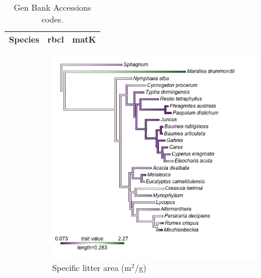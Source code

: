 \documentclass{article}
\begin{document}
\begin{table}[ht] \centering 
	\caption{Gen Bank Accessions codes.} 
	\label{Tab:genbank} 
	\begin{tabular}{l l l} 
	\toprule
		Species & rbcl & matK \\ 
		\midrule 
		
		\bottomrule
	\end{tabular} 
\end{table} 

\begin{figure}
   \centering
	\begin{subfigure}[h]{0.7\textwidth}
		\includegraphics[width=\textwidth]{figs/phylo_SLA.png}
		\caption{Specific litter area (m$^2$/g)}
		\label{Fig:phySLA}
	\end{subfigure} %
	\hfill
	\begin{subfigure}[h]{0.7\textwidth}

\end{subfigure}
\end{figure}
\end{document}
